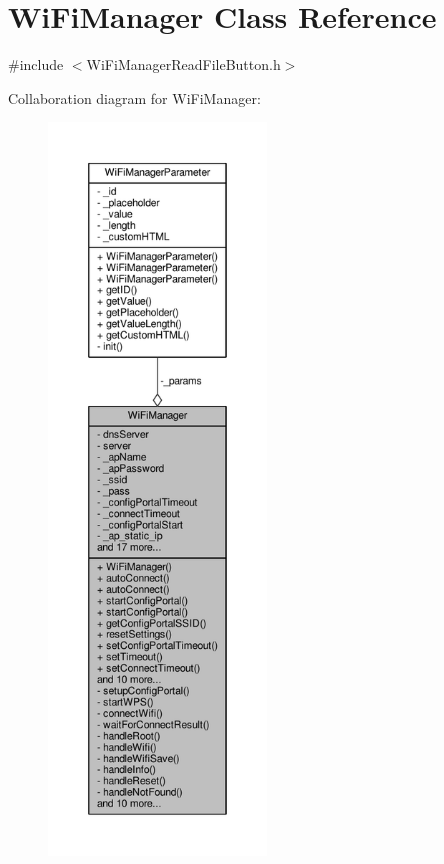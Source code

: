 \hypertarget{class_wi_fi_manager}{}\section{Wi\+Fi\+Manager Class Reference}
\label{class_wi_fi_manager}


{\ttfamily \#include $<$Wi\+Fi\+Manager\+Read\+File\+Button.\+h$>$}



Collaboration diagram for Wi\+Fi\+Manager\+:\nopagebreak
\begin{figure}[H]
\begin{center}
\leavevmode
\includegraphics[height=550pt]{class_wi_fi_manager__coll__graph}
\end{center}
\end{figure}

